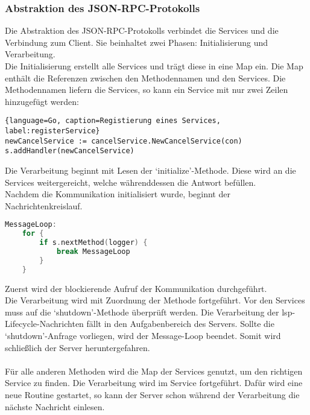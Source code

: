 \documentclass[./einleitung.tex]{subfiles}
\begin{document}
    \subsubsection{Abstraktion des JSON-RPC-Protokolls}
    Die Abstraktion des JSON-RPC-Protokolls verbindet die Services und die Verbindung zum Client.
    Sie beinhaltet zwei Phasen: Initialisierung und Verarbeitung.\\
    Die Initialisierung erstellt alle Services und trägt diese in eine Map ein.
    Die Map enthält die Referenzen zwischen den Methodennamen und den Services.
    Die Methodennamen liefern die Services, so kann ein Service mit nur zwei Zeilen hinzugefügt werden:
    \begin{lstlisting}{language=Go, caption=Registierung eines Services, label:registerService}
newCancelService := cancelService.NewCancelService(con)
s.addHandler(newCancelService)
    \end{lstlisting}
    Die Verarbeitung beginnt mit Lesen der `initialize'-Methode.
    Diese wird an die Services weitergereicht, welche währenddessen die Antwort befüllen.\\
    Nachdem die Kommunikation initialisiert wurde, beginnt der Nachrichtenkreislauf.
    \begin{lstlisting}[language=Go, caption=Nachrichtenkreislauf, label=lst:messageLopp]
MessageLoop:
	for {
		if s.nextMethod(logger) {
			break MessageLoop
		}
	}
    \end{lstlisting}
    Zuerst wird der blockierende Aufruf der Kommunikation durchgeführt. \\
    Die Verarbeitung wird mit Zuordnung der Methode fortgeführt.
    Vor den Services muss auf die `shutdown'-Methode überprüft werden.
    Die Verarbeitung der \acrshort{lsp}-Lifecycle-Nachrichten fällt in den Aufgabenbereich des Servers.
    Sollte die `shutdown'-Anfrage vorliegen, wird der Message-Loop beendet.
    Somit wird schließlich der Server heruntergefahren.
    \\\\
    Für alle anderen Methoden wird die Map der Services genutzt, um den richtigen Service zu finden.
    Die Verarbeitung wird im Service fortgeführt.
    Dafür wird eine neue Routine gestartet, so kann der Server schon während der Verarbeitung die nächste Nachricht einlesen.
\end{document}
